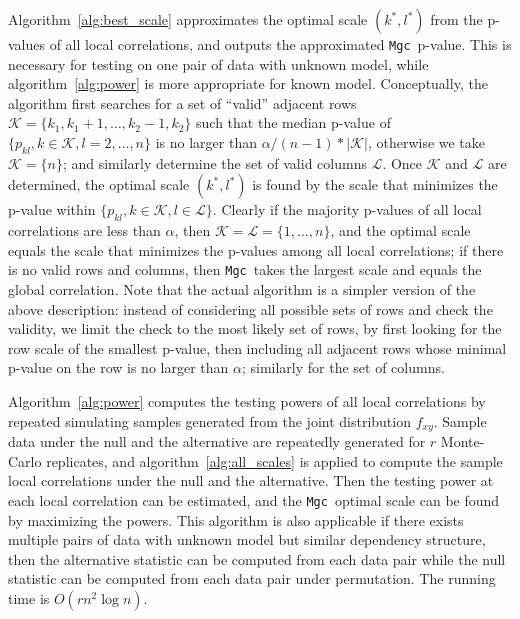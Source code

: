 \documentclass[11pt]{article}
\providecommand{\sct}[1]{{\sc \texttt{#1}}}
\newcommand{\K}{\mathcal{K}}
\newcommand{\LL}{\mathcal{L}}
\newcommand{\Mgc}{\sct{Mgc}}
\begin{document}
Algorithm~\ref{alg:best_scale} approximates the optimal scale $(k^{*},l^{*})$ from the p-values of all local correlations, and outputs the approximated \Mgc~p-value. This is necessary for testing on one pair of data with unknown model, while algorithm~\ref{alg:power} is more appropriate for known model. Conceptually, the algorithm first searches for a set of ``valid'' adjacent rows $\K=\{k_{1},k_{1}+1,\ldots,k_{2}-1,k_{2}\}$ such that the median p-value of $\{p_{kl},k \in \K, l=2,\ldots,n\}$
is no larger than $\alpha /(n-1) * |\K|$, otherwise we take $\K=\{n\}$; and similarly determine the set of valid columns $\LL$. Once $\K$ and $\LL$ are determined, the optimal scale $(k^{*},l^{*})$ is found by the scale that minimizes the p-value within $\{p_{kl},k \in \K, l \in \LL\}$. Clearly if the majority p-values of all local correlations are less than $\alpha$, then $\K=\LL=\{1,\ldots,n\}$, and the optimal scale equals the scale that minimizes the p-values among all local correlations; if there is no valid rows and columns, then \Mgc~takes the largest scale and equals the global correlation. Note that the actual algorithm is a simpler version of the above description: instead of considering all possible sets of rows and check the validity, we limit the check to the most likely set of rows, by first looking for the row scale of the smallest p-value, then including all adjacent rows whose minimal p-value on the row is no larger than $\alpha$; similarly for the set of columns.

Algorithm~\ref{alg:power} computes the testing powers of all local correlations by repeated simulating samples generated from the joint distribution $f_{xy}$. Sample data under the null and the alternative are repeatedly generated for $r$ Monte-Carlo replicates, and algorithm~\ref{alg:all_scales} is applied to compute the sample local correlations under the null and the alternative. Then the testing power at each local correlation can be estimated, and the \Mgc~optimal scale can be found by maximizing the powers. This algorithm is also applicable if there exists multiple pairs of data with unknown model but similar dependency structure, then the alternative statistic can be computed from each data pair while the null statistic can be computed from each data pair under permutation. The running time is $O(rn^2 \log n)$.
\end{document}
